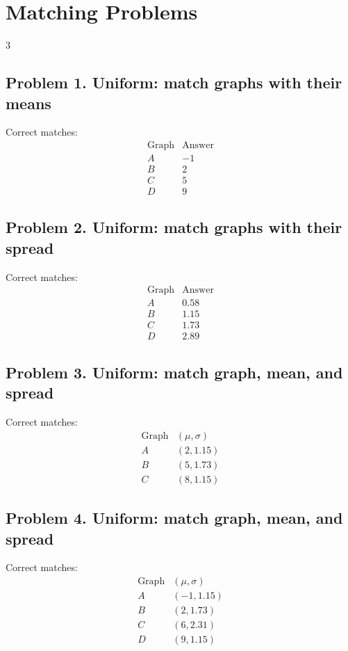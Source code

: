 \section{Matching Problems}
\begin{multicols}{3}

\subsection*{Problem 1. Uniform: match graphs with their means}
Correct matches:
\[
\begin{array}{c|c}
\text{Graph} & \text{Answer} \\
\hline
A & -1 \\
B & 2 \\
C & 5 \\
D & 9
\end{array}
\]

\subsection*{Problem 2. Uniform: match graphs with their spread}
Correct matches:
\[
\begin{array}{c|c}
\text{Graph} & \text{Answer} \\
\hline
A & 0.58 \\
B & 1.15 \\
C & 1.73 \\
D & 2.89
\end{array}
\]

\subsection*{Problem 3. Uniform: match graph, mean, and spread}
Correct matches:
\[
\begin{array}{c|c}
\text{Graph} & (\mu,\sigma) \\
\hline
A & (2,1.15) \\
B & (5,1.73) \\
C & (8,1.15)
\end{array}
\]

\subsection*{Problem 4. Uniform: match graph, mean, and spread}
Correct matches:
\[
\begin{array}{c|c}
\text{Graph} & (\mu,\sigma) \\
\hline
A & (-1,1.15) \\
B & (2,1.73) \\
C & (6,2.31) \\
D & (9,1.15)
\end{array}
\]


\end{multicols}
